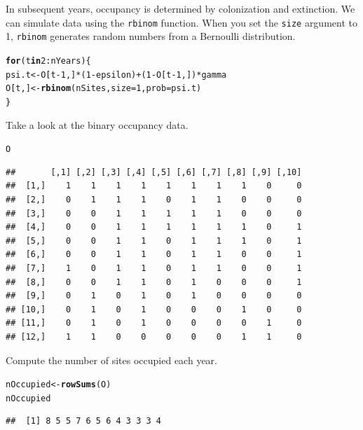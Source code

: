 \documentclass[12pt]{article}\usepackage[]{graphicx}\usepackage[]{color}
\makeatletter
\newcommand{\hlnum}[1]{\textcolor[rgb]{0.686,0.059,0.569}{#1}}%
\newcommand{\hlopt}[1]{\textcolor[rgb]{0,0,0}{#1}}%
\newcommand{\hlstd}[1]{\textcolor[rgb]{0.345,0.345,0.345}{#1}}%
\newcommand{\hlkwa}[1]{\textcolor[rgb]{0.161,0.373,0.58}{\textbf{#1}}}%
\newcommand{\hlkwb}[1]{\textcolor[rgb]{0.69,0.353,0.396}{#1}}%
\newcommand{\hlkwc}[1]{\textcolor[rgb]{0.333,0.667,0.333}{#1}}%
\newcommand{\hlkwd}[1]{\textcolor[rgb]{0.737,0.353,0.396}{\textbf{#1}}}%
\newenvironment{kframe}{%
 \def\at@end@of@kframe{}%
 \ifinner\ifhmode%
  \def\at@end@of@kframe{\end{minipage}}%
  \begin{minipage}{\columnwidth}%
 \fi\fi%
 \def\FrameCommand##1{\hskip\@totalleftmargin \hskip-\fboxsep
 \colorbox{shadecolor}{##1}\hskip-\fboxsep
     \hskip-\linewidth \hskip-\@totalleftmargin \hskip\columnwidth}%
 \MakeFramed {\advance\hsize-\width
   \@totalleftmargin\z@ \linewidth\hsize
   \@setminipage}}%
 {\par\unskip\endMakeFramed%
 \at@end@of@kframe}
\newenvironment{knitrout}{}{} %
\makeatother
\begin{document}
In subsequent years, occupancy is determined by colonization and
extinction. We can simulate data using the {\tt rbinom}
function. When you set the {\tt size} argument to 1, {\tt rbinom}
generates random numbers from a Bernoulli distribution.
\begin{knitrout}
\color{fgcolor}\begin{kframe}
\begin{alltt}
\hlkwa{for}\hlstd{(t} \hlkwa{in} \hlnum{2}\hlopt{:}\hlstd{nYears) \{}
    \hlstd{psi.t} \hlkwb{<-} \hlstd{O[t}\hlopt{-}\hlnum{1}\hlstd{,]}\hlopt{*}\hlstd{(}\hlnum{1}\hlopt{-}\hlstd{epsilon)} \hlopt{+} \hlstd{(}\hlnum{1}\hlopt{-}\hlstd{O[t}\hlopt{-}\hlnum{1}\hlstd{,])}\hlopt{*}\hlstd{gamma}
    \hlstd{O[t,]} \hlkwb{<-} \hlkwd{rbinom}\hlstd{(nSites,} \hlkwc{size}\hlstd{=}\hlnum{1}\hlstd{,} \hlkwc{prob}\hlstd{=psi.t)}
\hlstd{\}}
\end{alltt}
\end{kframe}
\end{knitrout}

Take a look at the binary occupancy data.
\begin{knitrout}
\color{fgcolor}\begin{kframe}
\begin{alltt}
\hlstd{O}
\end{alltt}
\begin{verbatim}
##       [,1] [,2] [,3] [,4] [,5] [,6] [,7] [,8] [,9] [,10]
##  [1,]    1    1    1    1    1    1    1    1    0     0
##  [2,]    0    1    1    1    0    1    1    0    0     0
##  [3,]    0    0    1    1    1    1    1    0    0     0
##  [4,]    0    0    1    1    1    1    1    1    0     1
##  [5,]    0    0    1    1    0    1    1    1    0     1
##  [6,]    0    0    1    1    0    1    1    0    0     1
##  [7,]    1    0    1    1    0    1    1    0    0     1
##  [8,]    0    0    1    1    0    1    0    0    0     1
##  [9,]    0    1    0    1    0    1    0    0    0     0
## [10,]    0    1    0    1    0    0    0    1    0     0
## [11,]    0    1    0    1    0    0    0    0    1     0
## [12,]    1    1    0    0    0    0    0    1    1     0
\end{verbatim}
\end{kframe}
\end{knitrout}

Compute the number of sites occupied each year.
\begin{knitrout}
\color{fgcolor}\begin{kframe}
\begin{alltt}
\hlstd{nOccupied} \hlkwb{<-} \hlkwd{rowSums}\hlstd{(O)}
\hlstd{nOccupied}
\end{alltt}
\begin{verbatim}
##  [1] 8 5 5 7 6 5 6 4 3 3 3 4
\end{verbatim}
\end{kframe}
\end{knitrout}
\end{document}
